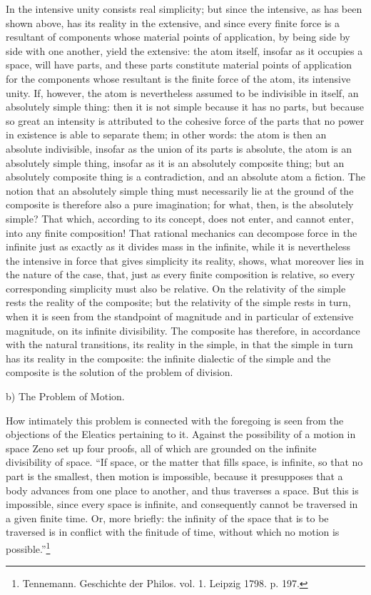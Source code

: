 \documentclass[12pt,a4paper,openany]{book}
\newcommand{\opage}[1]{\marginnote{\footnotesize\textit{[#1]}}}
\begin{document}
In the intensive unity consists real simplicity; but since the intensive, as has been shown above, has its reality in the extensive, and since every finite force is a resultant of components whose material points of application, by being side by side with one another, yield the extensive: the atom itself, insofar as it occupies a space, will have parts, and these parts constitute material points of application for the components whose resultant is the finite force of the atom, its intensive unity. If, however, the atom is nevertheless assumed to be indivisible in itself, an absolutely simple thing: then it is not simple because it has no parts, but because so great an intensity is attributed to the cohesive force of the parts that no
\setcounter{footnote}{0}%
\opage{131}power in existence is able to separate them; in other words: the atom is then an absolute indivisible, insofar as the union of its parts is absolute, the atom is an absolutely simple thing, insofar as it is an absolutely composite thing; but an absolutely composite thing is a contradiction, and an absolute atom a fiction. The notion that an absolutely simple thing must necessarily lie at the ground of the composite is therefore also a pure imagination; for what, then, is the absolutely simple? That which, according to its concept, does not enter, and cannot enter, into any finite composition! That rational mechanics can decompose force in the infinite just as exactly as it divides mass in the infinite, while it is nevertheless the intensive in force that gives simplicity its reality, shows, what moreover lies in the nature of the case, that, just as every finite composition is relative, so every corresponding simplicity must also be relative. On the relativity of the simple rests the reality of the composite; but the relativity of the simple rests in turn, when it is seen from the standpoint of magnitude and in particular of extensive magnitude, on its infinite divisibility. The composite has therefore, in accordance with the natural transitions, its reality in the simple, in that the simple in turn has its reality in the composite: the infinite dialectic of the simple and the composite is the solution of the problem of division.

\begin{center}b) The Problem of Motion.\end{center}

How intimately this problem is connected with the foregoing is seen from the objections of the Eleatics pertaining to it. Against the possibility of a motion in space Zeno set up four proofs, all of which are grounded on the infinite divisibility of space. ``If space, or the matter that fills space, is infinite, so that no part is the smallest, then motion is impossible, because it presupposes that a body advances from one place to another, and thus traverses a space. But this is impossible, since every space
\setcounter{footnote}{0}%
\opage{132}is infinite, and consequently cannot be traversed in a given finite time. Or, more briefly: the infinity of the space that is to be traversed is in conflict with the finitude of time, without which no motion is possible.''\footnote[1]{Tennemann. Geschichte der Philos. vol. 1. Leipzig 1798. p. 197.}
\end{document}
